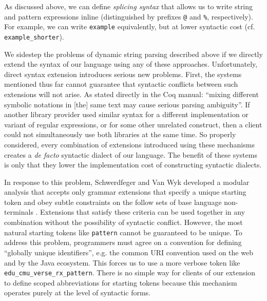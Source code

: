 As discussed above, we can define \emph{splicing syntax} that allows us to write string and pattern expressions inline (distinguished by prefixes \lstinline{@} and \lstinline{%}, respectively). 
For example, we can write \lstinline{example} equivalently, but at lower syntactic cost (cf. \lstinline{example_shorter}).

We sidestep the problems of dynamic string parsing described above  if we directly extend the syntax of our language using any of these approaches. Unfortunately, direct syntax extension introduces serious new problems. First, the systems mentioned thus far cannot guarantee that {syntactic conflicts} between such extensions will not arise. As stated directly in the  Coq manual: ``mixing different symbolic notations in [the] same text may cause serious parsing ambiguity''. If another library provider used similar syntax for a different implementation or variant of regular expressions, or for some other unrelated construct, then a client could not simultaneously use both libraries at the same time. So properly considered, every combination of extensions introduced using these mechanisms creates a \emph{de facto} syntactic dialect of our language. The benefit of these systems is only that they lower the implementation cost of constructing syntactic dialects. %

In response to this problem, Schwerdfeger and Van Wyk developed a modular analysis that accepts only grammar extensions that specify a unique starting token and obey subtle constraints on  the follow sets of base language non-terminals \cite{conf/pldi/SchwerdfegerW09}. Extensions that satisfy these criteria can be used together in any combination without the possibility of syntactic conflict. However, the most natural starting tokens like \lstinline{pattern} cannot be guaranteed to be unique. To address this problem, programmers must agree on a convention for defining ``globally unique identifiers'', e.g. the common URI convention used on the web and by the Java ecosystem. This forces us to use a more verbose token like \lstinline{edu_cmu_verse_rx_pattern}. There is no simple way for clients of our extension to define scoped abbreviations for starting tokens because this mechanism operates purely at the level of syntactic forms.

